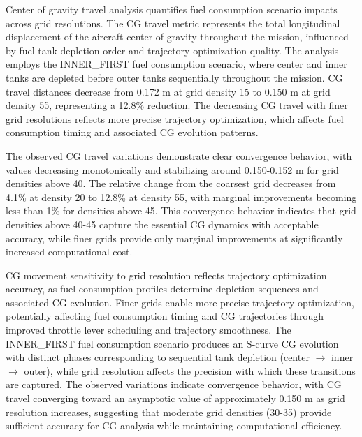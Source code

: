 Center of gravity travel analysis quantifies fuel consumption scenario impacts across grid resolutions. The CG travel metric represents the total longitudinal displacement of the aircraft center of gravity throughout the mission, influenced by fuel tank depletion order and trajectory optimization quality. The analysis employs the INNER\_FIRST fuel consumption scenario, where center and inner tanks are depleted before outer tanks sequentially throughout the mission. CG travel distances decrease from 0.172 m at grid density 15 to 0.150 m at grid density 55, representing a 12.8\% reduction. The decreasing CG travel with finer grid resolutions reflects more precise trajectory optimization, which affects fuel consumption timing and associated CG evolution patterns.

The observed CG travel variations demonstrate clear convergence behavior, with values decreasing monotonically and stabilizing around 0.150-0.152 m for grid densities above 40. The relative change from the coarsest grid decreases from 4.1\% at density 20 to 12.8\% at density 55, with marginal improvements becoming less than 1\% for densities above 45. This convergence behavior indicates that grid densities above 40-45 capture the essential CG dynamics with acceptable accuracy, while finer grids provide only marginal improvements at significantly increased computational cost.

CG movement sensitivity to grid resolution reflects trajectory optimization accuracy, as fuel consumption profiles determine depletion sequences and associated CG evolution. Finer grids enable more precise trajectory optimization, potentially affecting fuel consumption timing and CG trajectories through improved throttle lever scheduling and trajectory smoothness. The INNER\_FIRST fuel consumption scenario produces an S-curve CG evolution with distinct phases corresponding to sequential tank depletion (center $\rightarrow$ inner $\rightarrow$ outer), while grid resolution affects the precision with which these transitions are captured. The observed variations indicate convergence behavior, with CG travel converging toward an asymptotic value of approximately 0.150 m as grid resolution increases, suggesting that moderate grid densities (30-35) provide sufficient accuracy for CG analysis while maintaining computational efficiency.



